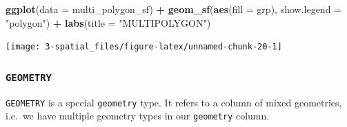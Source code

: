 \documentclass[
]{report}
\newenvironment{Shaded}{\begin{snugshade}}{\end{snugshade}}
\newcommand{\DataTypeTok}[1]{\textcolor[rgb]{0.13,0.29,0.53}{#1}}
\newcommand{\KeywordTok}[1]{\textcolor[rgb]{0.13,0.29,0.53}{\textbf{#1}}}
\newcommand{\NormalTok}[1]{#1}
\newcommand{\OperatorTok}[1]{\textcolor[rgb]{0.81,0.36,0.00}{\textbf{#1}}}
\newcommand{\StringTok}[1]{\textcolor[rgb]{0.31,0.60,0.02}{#1}}
\begin{document}
\begin{Shaded}
\begin{Highlighting}[]
\KeywordTok{ggplot}\NormalTok{(}\DataTypeTok{data =}\NormalTok{ multi\_polygon\_sf) }\OperatorTok{+}
\StringTok{  }\KeywordTok{geom\_sf}\NormalTok{(}\KeywordTok{aes}\NormalTok{(}\DataTypeTok{fill =}\NormalTok{ grp), }\DataTypeTok{show.legend =} \StringTok{"polygon"}\NormalTok{) }\OperatorTok{+}
\StringTok{  }\KeywordTok{labs}\NormalTok{(}\DataTypeTok{title =} \StringTok{"MULTIPOLYGON"}\NormalTok{)}
\end{Highlighting}
\end{Shaded}

\begin{center}\texttt{[image: 3-spatial\_files/figure-latex/unnamed-chunk-20-1]} \end{center}

\hypertarget{geometry-1}{%
\subsubsection{\texorpdfstring{\texttt{GEOMETRY}}{GEOMETRY}}\label{geometry-1}}

\texttt{GEOMETRY} is a special \texttt{geometry} type. It refers to a column of mixed geometries, i.e.~we have multiple geometry types in our \texttt{geometry} column.
\end{document}
